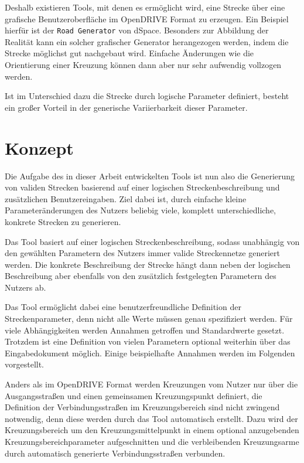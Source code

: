 Deshalb existieren Tools, mit denen es ermöglicht wird, eine Strecke über eine grafische Benutzeroberfläche im OpenDRIVE Format zu erzeugen. Ein Beispiel hierfür ist der \texttt{Road Generator} von dSpace.\cite{RoadGenerator.2019} Besonders zur Abbildung der Realität kann ein solcher grafischer Generator herangezogen werden, indem die Strecke möglichst gut nachgebaut wird. Einfache Änderungen wie die Orientierung einer Kreuzung können dann aber nur sehr aufwendig vollzogen werden.

Ist im Unterschied dazu die Strecke durch logische Parameter definiert, besteht ein großer Vorteil in der generische Variierbarkeit dieser Parameter.

\chapter {Konzept}
Die Aufgabe des in dieser Arbeit entwickelten Tools ist nun also die Generierung von validen Strecken basierend auf einer logischen Streckenbeschreibung und zusätzlichen Benutzereingaben. Ziel dabei ist, durch einfache kleine Parameteränderungen des Nutzers beliebig viele, komplett unterschiedliche, konkrete Strecken zu generieren.

Das Tool basiert auf einer logischen Streckenbeschreibung, sodass unabhängig von den gewählten Parametern des Nutzers immer valide Streckennetze generiert werden. Die konkrete Beschreibung der Strecke hängt dann neben der logischen Beschreibung aber ebenfalls von den zusätzlich festgelegten Parametern des Nutzers ab.

Das Tool ermöglicht dabei eine benutzerfreundliche Definition der Streckenparameter, denn nicht alle Werte müssen genau spezifiziert werden. Für viele Abhängigkeiten werden Annahmen getroffen und Standardwerte gesetzt. Trotzdem ist eine Definition von vielen Parametern optional weiterhin über das Eingabedokument möglich. Einige beispielhafte Annahmen werden im Folgenden vorgestellt.

Anders als im OpenDRIVE Format werden Kreuzungen vom Nutzer nur über die Ausgangsstraßen und einen gemeinsamen Kreuzungspunkt definiert, die Definition der Verbindungsstraßen im Kreuzungsbereich sind nicht zwingend notwendig, denn diese werden durch das Tool automatisch erstellt. Dazu wird der Kreuzungsbereich um den Kreuzungsmittelpunkt in einem optional anzugebenden Kreuzungsbereichparameter aufgeschnitten und die verbleibenden Kreuzungsarme durch automatisch generierte Verbindungsstraßen verbunden.

